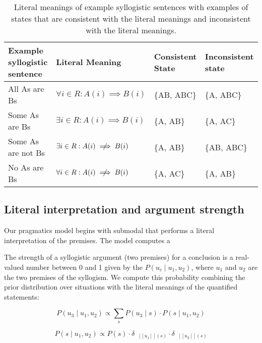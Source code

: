 \documentclass[floatsintext, doc]{apa6}
\newcommand{\denote}[1]{\mbox{ $[\![ #1 ]\!]$}}
\begin{document}
\begin{table}[]
\begin{tabular}{@{}llll@{}}
\toprule
Example syllogistic sentence & Literal Meaning                                                                       & Consistent State & Inconsistent state \\ \midrule
All As are Bs                                      & $\forall i \in R: A(i) \implies B(i) $ & \{AB, ABC\}                           & \{A, ABC\}                              \\
Some As are Bs                                     & $\exists i \in R: A(i) \implies B(i) $ & \{A, AB\}                             & \{A, AC\}                               \\
Some As are not Bs                                 & $\exists i \in R: A(i)  \centernot \implies B(i) $ & \{A, AB\}                             & \{AB, ABC\}                             \\
No As are Bs                                       & $\forall i \in R: A(i) \centernot \implies B(i) $  & \{A, AC\}                             & \{A, AB\} \\ \bottomrule
\end{tabular}
\caption{Literal meanings of example syllogistic sentences with examples of states that are consistent with the literal meanings and inconsistent with the literal meanings.}
\label{tab:sem}
\end{table}


\subsection{Literal interpretation and argument strength}

Our pragmatics model begins with submodal that performs a literal interpretation of the premises. 
The model computes a 

The strength of a syllogistic argument (two premises) for a conclusion is a real-valued number between 0 and 1 given by the $P(u_c \mid u_1, u_2)$, where $u_1$ and $u_2$ are the two premises of the syllogism.
We compute this probability combining the prior distribution over situations with the literal meanings of the quantified statements: 

$$
P(u_3 \mid u_1, u_2) \propto \sum_s P(u_3\mid s) \cdot P(s \mid u_1, u_2)
$$

$$P(s \mid u_1, u_2) \propto P(s)\cdot \delta_{\denote{u_1}(s)} \cdot \delta_{\denote{u_2}(s)} $$
\end{document}
